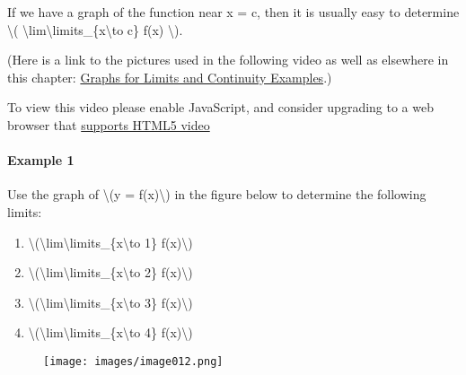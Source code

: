 If we have a graph of the function near x = c, then it is usually easy
to determine \textbackslash{}(
\textbackslash{}lim\textbackslash{}limits\_\{x\textbackslash{}to c\}
f(x) \textbackslash{}).

(Here is a link to the pictures used in the following video as well as
elsewhere in this chapter:
\href{otherfiles/graphs_for_limit_and_continuity_videos_math141.pdf}{Graphs
for Limits and Continuity Examples}.)

To view this video please enable JavaScript, and consider upgrading to a
web browser that \href{http://videojs.com/html5-video-support/}{supports
HTML5 video}

\hypertarget{example-1}{%
\paragraph{Example 1}\label{example-1}}

Use the graph of \textbackslash{}(y = f(x)\textbackslash{}) in the
figure below to determine the following limits:

\begin{enumerate}
\tightlist
\item
  \textbackslash{}(\textbackslash{}lim\textbackslash{}limits\_\{x\textbackslash{}to
  1\} f(x)\textbackslash{})
\item
  \textbackslash{}(\textbackslash{}lim\textbackslash{}limits\_\{x\textbackslash{}to
  2\} f(x)\textbackslash{})
\item
  \textbackslash{}(\textbackslash{}lim\textbackslash{}limits\_\{x\textbackslash{}to
  3\} f(x)\textbackslash{})
\item
  \textbackslash{}(\textbackslash{}lim\textbackslash{}limits\_\{x\textbackslash{}to
  4\} f(x)\textbackslash{})
\end{enumerate}

\begin{figure}
\centering
\texttt{[image: images/image012.png]}
\caption{}
\end{figure}

